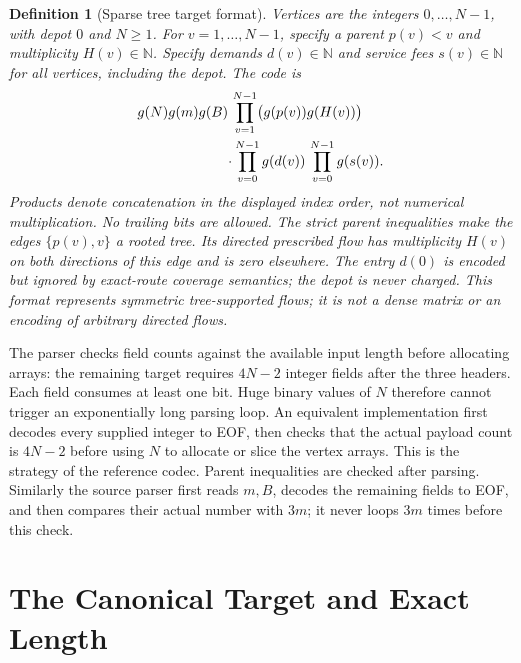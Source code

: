 \documentclass[11pt]{article}
\newtheorem{definition}{Definition}[section]
\theoremstyle{remark}
\newcommand{\N}{\mathbb N}
\begin{document}
\begin{definition}[Sparse tree target format]\label{def:target}
Vertices are the integers $0,\ldots,N-1$, with depot $0$ and $N\ge1$.
For $v=1,\ldots,N-1$, specify a parent $p(v)<v$ and multiplicity $H(v)\in\N$.
Specify demands $d(v)\in\N$ and service fees $s(v)\in\N$ for all vertices,
including the depot. The code is
\begin{equation}\label{eq:target}
 \begin{aligned}
 &g(N)g(m)g(B)\,\prod_{v=1}^{N-1}\bigl(g(p(v))g(H(v))\bigr)\\
 &\hspace{22mm}\cdot\prod_{v=0}^{N-1}g(d(v))\,\prod_{v=0}^{N-1}g(s(v)).
 \end{aligned}
\end{equation}
Products denote concatenation in the displayed index order, not numerical
multiplication. No trailing bits are allowed. The strict parent inequalities
make the edges $\{p(v),v\}$ a rooted tree. Its directed prescribed flow has
multiplicity $H(v)$ on both directions of this edge and is zero elsewhere.
The entry $d(0)$ is encoded but ignored by exact-route coverage semantics;
the depot is never charged. This format represents symmetric tree-supported
flows; it is not a dense matrix or an encoding of arbitrary directed flows.
\end{definition}

The parser checks field counts against the available input length before
allocating arrays: the remaining target requires $4N-2$ integer fields after
the three headers. Each field consumes at least one bit. Huge binary values
of $N$ therefore cannot trigger an exponentially long parsing loop.
An equivalent implementation first decodes every supplied integer to EOF,
then checks that the actual payload count is $4N-2$ before using $N$ to
allocate or slice the vertex arrays. This is the strategy of the reference
codec. Parent inequalities are checked after parsing. Similarly the source parser
first reads $m,B$, decodes the remaining fields to EOF, and then compares
their actual number with $3m$; it never loops $3m$ times before this check.

\section{The Canonical Target and Exact Length}
\label{sec:length}
\end{document}
